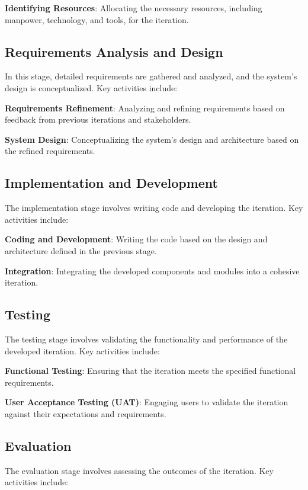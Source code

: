 \textbf{Identifying Resources}:
Allocating the necessary resources, including manpower, technology, and tools, for the iteration.

\subsection{Requirements Analysis and Design}

In this stage, detailed requirements are gathered and analyzed, and the system's design is conceptualized. Key activities include:

\textbf{Requirements Refinement}:
Analyzing and refining requirements based on feedback from previous iterations and stakeholders.

\textbf{System Design}:
Conceptualizing the system's design and architecture based on the refined requirements.

\subsection{Implementation and Development}

The implementation stage involves writing code and developing the iteration. Key activities include:

\textbf{Coding and Development}:
Writing the code based on the design and architecture defined in the previous stage.

\textbf{Integration}:
Integrating the developed components and modules into a cohesive iteration.

\subsection{Testing}

The testing stage involves validating the functionality and performance of the developed iteration. Key activities include:

\textbf{Functional Testing}:
Ensuring that the iteration meets the specified functional requirements.

\textbf{User Acceptance Testing (UAT)}:
Engaging users to validate the iteration against their expectations and requirements.

\subsection{Evaluation}

The evaluation stage involves assessing the outcomes of the iteration. Key activities include:

